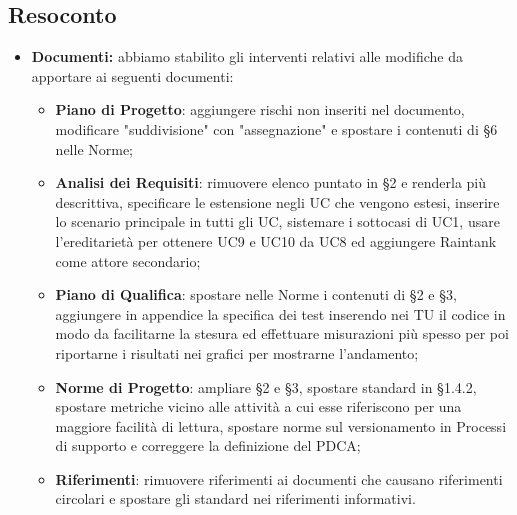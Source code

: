 \subsection{Resoconto}
\begin{itemize}
	\item{ \textbf{Documenti:} abbiamo stabilito gli interventi relativi alle modifiche da apportare ai seguenti documenti:
		\begin{itemize}
			\item \textbf{Piano di Progetto}: aggiungere rischi non inseriti nel documento, modificare "suddivisione" con "assegnazione" e spostare i contenuti di §6 nelle Norme;
			\item \textbf{Analisi dei Requisiti}: rimuovere elenco puntato in §2 e renderla più descrittiva, specificare le estensione negli UC che vengono estesi, inserire lo scenario principale in tutti gli UC, sistemare i sottocasi di UC1, usare l'ereditarietà per ottenere UC9 e UC10 da UC8 ed aggiungere Raintank come attore secondario;
			\item \textbf{Piano di Qualifica}: spostare nelle Norme i contenuti di §2 e §3, aggiungere in appendice la specifica dei test inserendo nei TU il codice in modo da facilitarne la stesura ed effettuare misurazioni più spesso per poi riportarne i risultati nei grafici per mostrarne l'andamento;
			\item \textbf{Norme di Progetto}: ampliare §2 e §3, spostare standard in §1.4.2, spostare metriche vicino alle attività a cui esse riferiscono per una maggiore facilità di lettura, spostare norme sul versionamento in Processi di supporto e correggere la definizione del PDCA;
			\item \textbf{Riferimenti}: rimuovere riferimenti ai documenti che causano riferimenti circolari e spostare gli standard nei riferimenti informativi.
		\end{itemize}}	

\end{itemize}

